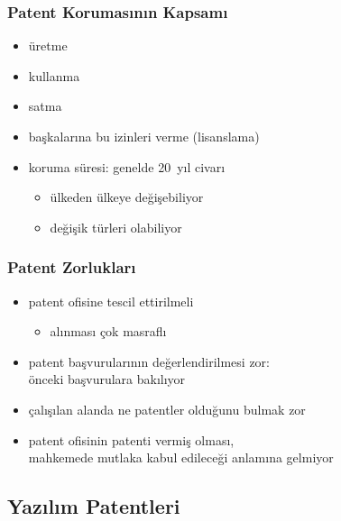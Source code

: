 \documentclass[dvipsnames]{beamer}
\theoremstyle{definition}
\theoremstyle{example}
\theoremstyle{plain}
\begin{document}
\begin{frame}
  \frametitle{Patent Korumasının Kapsamı}

  \begin{itemize}
    \item üretme
    \item kullanma
    \item satma
    \item başkalarına bu izinleri verme (lisanslama)

    \pause
    \medskip
    \item koruma süresi: genelde 20~yıl civarı
    \begin{itemize}
      \item ülkeden ülkeye değişebiliyor
      \item değişik türleri olabiliyor
    \end{itemize}
  \end{itemize}
\end{frame}

\begin{frame}
  \frametitle{Patent Zorlukları}

  \begin{itemize}
    \item patent ofisine tescil ettirilmeli
    \begin{itemize}
      \item alınması çok masraflı
    \end{itemize}

    \pause
    \medskip
    \item patent başvurularının değerlendirilmesi zor:\\
      önceki başvurulara bakılıyor

    \pause
    \medskip
    \item çalışılan alanda ne patentler olduğunu bulmak zor

    \pause
    \medskip
    \item patent ofisinin patenti vermiş olması,\\
      mahkemede mutlaka kabul edileceği anlamına gelmiyor
  \end{itemize}
\end{frame}

\subsection{Yazılım Patentleri}
\end{document}
